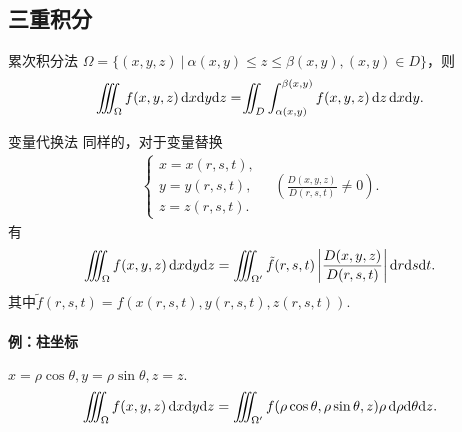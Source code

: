 \subsection{三重积分}
\begin{theorem}
	{累次积分法}{}
	$\Omega=\{(x,y,z)~|~\alpha(x,y)\leqslant z\leqslant\beta(x,y),(x,y)\in D\}$，则
	\[\inttt_\Omega f(x,y,z)\d x\nd y\nd z=\intt_D\int_{\alpha(x,y)}^{\beta(x,y)}f(x,y,z)\d z\d x\nd y.\]
\end{theorem}
\begin{theorem}
	{变量代换法}{}
	同样的，对于变量替换
	\begin{align*}
		\begin{cases}
			x=x(r,s,t), \\
			y=y(r,s,t), \\
			z=z(r,s,t).
		\end{cases}
		\quad\left(\frac{D(x,y,z)}{D(r,s,t)}\neq 0\right).
	\end{align*}
	有
	\[\inttt_\Omega f(x,y,z)\d x\nd y\nd z=\inttt_{\Omega'}\tilde f(r,s,t)\abs{\frac{D(x,y,z)}{D(r,s,t)}}\d r\nd s\nd t.\]
	其中$\tilde f(r,s,t)=f(x(r,s,t),y(r,s,t),z(r,s,t)).$
\end{theorem}
\paragraph{例：柱坐标}$x=\rho\cos\theta,y=\rho\sin\theta,z=z.$
\[\inttt_\Omega f(x,y,z)\d x\nd y\nd z=\inttt_{\Omega'}f(\rho\cos\theta,\rho\sin\theta,z)\rho\d\rho\nd\theta\nd z.\]
